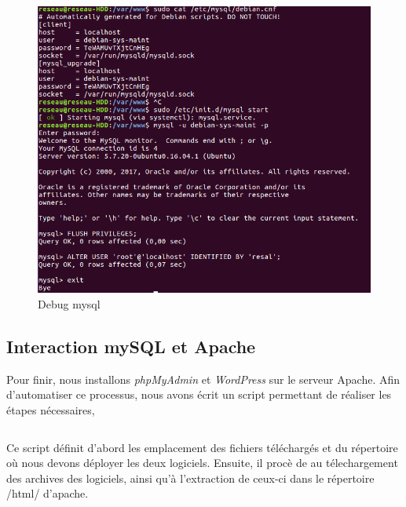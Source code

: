 \begin{figure}[H]
\centering
\includegraphics[width=400pt]{./TP3/Pictures/debug_mysql}
\caption{Debug mysql}
\label{Debug mysql}
\end{figure}

\subsection{Interaction mySQL et Apache}
Pour finir, nous installons \textit{phpMyAdmin} et \textit{WordPress} sur le serveur Apache. Afin d'automatiser ce processus, nous avons écrit un script permettant de réaliser les étapes nécessaires,

\inputminted[linenos]{bash}{../sources/TP3/server/LAMP/lamp.sh}

Ce script définit d'abord les emplacement des fichiers téléchargés et du répertoire où nous devons déployer les deux logiciels. Ensuite, il procè
de au télechargement des archives des logiciels, ainsi qu'à l'extraction de ceux-ci dans le répertoire /html/ d'apache.
